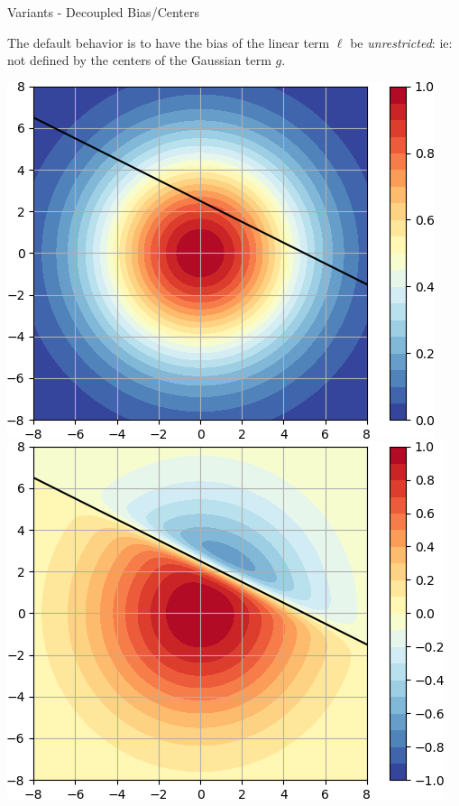 \documentclass{beamer}
\begin{document}
\begin{frame}{Variants - Decoupled Bias/Centers}
    \vspace{-0.7cm}
    \begin{block}{}
    The default behavior is to have the bias of the linear term $\ell$ be \emph{unrestricted}: ie: not defined by the centers of the Gaussian term $g$.
    \end{block}
    
    \vspace{0.4cm}
    
    \centering
    \includegraphics[height=0.5\textheight]{images/2D-Decoupled/var-decoupled-center-g-cropped.png}
    \includegraphics[height=0.5\textheight]{images/2D-Decoupled/var-decoupled-center-activity-cropped.png}\\
    
\end{frame}
\end{document}
